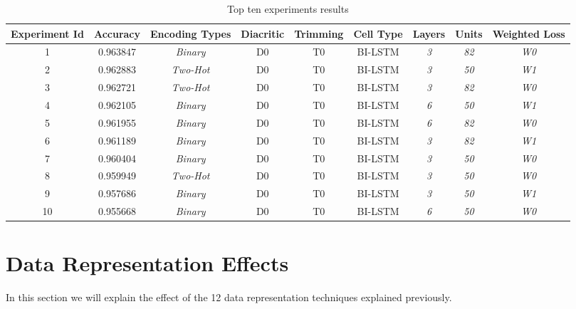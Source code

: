 \begin{table}[!h]
	\centering
	\begin{tabular}{c c c c c c c c c}
		\hline
		\textbf{Experiment Id} & \textbf{Accuracy}  &  \textbf{Encoding Types} & \textbf{Diacritic} &\textbf{Trimming}& \textbf{Cell Type} & \textbf{Layers} & \textbf{Units} & \textbf{Weighted Loss}\\
		
		\hline
1 & 0.963847 & \textit{Binary} & D0 & T0 & BI-LSTM & \textit{3} &  \textit{82} & \textit{W0} \\
2 & 0.962883 & \textit{Two-Hot} & D0 & T0 & BI-LSTM & \textit{3} &  \textit{50} & \textit{W1}\\
3 & 0.962721 & \textit{Two-Hot} & D0 & T0 & BI-LSTM & \textit{3} &  \textit{82} & \textit{W0} \\
4 & 0.962105 & \textit{Binary} & D0 & T0 & BI-LSTM & \textit{6} &  \textit{50} & \textit{W1} \\
5 & 0.961955 & \textit{Binary} & D0 & T0 & BI-LSTM & \textit{6} &  \textit{82} & \textit{W0} \\
6 & 0.961189 & \textit{Binary} & D0& T0 & BI-LSTM & \textit{3}  &  \textit{82}& \textit{W1} \\
7 & 0.960404 & \textit{Binary} & D0 & T0 & BI-LSTM & \textit{3} &  \textit{50} & \textit{W0} \\
8 & 0.959949 & \textit{Two-Hot} & D0 & T0 & BI-LSTM & \textit{3} &  \textit{50} & \textit{W0} \\
9 & 0.957686 & \textit{Binary} & D0 & T0 & BI-LSTM & \textit{3} &  \textit{50} & \textit{W1} \\
10 & 0.955668 & \textit{Binary} & D0 & T0 & BI-LSTM & \textit{6} &  \textit{50} & \textit{W0} \\
\hline
	\end{tabular}
	\caption{Top ten experiments results}\label{Tab:Exp_Results}
\end{table}


\section{Data Representation Effects}

In this section we will explain the effect of the 12 data representation techniques explained previously.

